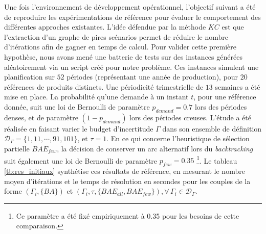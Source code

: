 \documentclass[12pt, a4paper, twoside]{article}
\numberwithin{equation}{section}
\begin{document}
	Une fois l'environnement de développement opérationnel, l'objectif suivant a été de reproduire les expérimentations de référence pour évaluer le comportement des différentes approches existantes. L'idée défendue par la méthode $KC$ est que l'extraction d'un graphe de pires scénarios permet de réduire le nombre d'itérations afin de gagner en temps de calcul. Pour valider cette première hypothèse, nous avons mené une batterie de tests sur des instances générées aléatoirement via un script créé pour notre problème. Ces instances simulent une planification sur $52$ périodes (représentant une année de production), pour $20$ références de produits distincts. Une périodicité trimestrielle de $13$ semaines a été mise en place. La probabilité qu'une demande à un instant $t$, pour une référence donnée, suit une loi de Bernoulli de paramètre $p_{demand}=0.7$ lors des périodes denses, et de paramètre $(1-p_{demand})$ lors des périodes creuses. L'étude a été réalisée en faisant varier le budget d'incertitude $\Gamma$ dans son ensemble de définition $\mathcal{D}_{\Gamma}=\{1, 11, \cdots, 91, 101\}$, et $\tau=1$. En ce qui concerne l'heuristique de sélection partielle $BAE_{few}$, la décision de conserver un arc alternatif lors du \textit{backtracking} suit également une loi de Bernoulli de paramètre $p_{few}=0.35$ \footnote{Ce paramètre a été fixé empiriquement à 0.35 pour les besoins de cette comparaison.}. Le tableau \ref{tb:res_initiaux} synthétise ces résultats de référence, en mesurant le nombre moyen d'itérations et le temps de résolution en secondes pour les couples de la forme $(\Gamma_i, \{BA\})$ et $(\Gamma_i, \tau, \{BAE_{all}, BAE_{few}\}), \forall\, \Gamma_i\in\mathcal{D}_{\Gamma}$.
	
\end{document}
